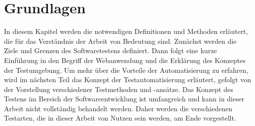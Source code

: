 \chapter{Grundlagen}\label{ch:grundlagen}

In diesem Kapitel werden die notwendigen Definitionen und Methoden erläutert,
die für das Verständnis der Arbeit von Bedeutung sind. Zunächst werden die
Ziele und Grenzen des Softwaretestens definiert. Dann folgt eine kurze
Einführung in den Begriff der Webanwendung und  die Erklärung des Konzeptes
der Testumgebung. Um mehr über die Vorteile der Automatisierung zu erfahren,
wird im nächsten Teil das Konzept der Testautomatisierung erläutert, gefolgt
von der Vorstellung verschiedener Testmethoden und -ansätze. Das Konzept des
Testens im Bereich der Softwareentwicklung ist umfangreich und kann in dieser
Arbeit nicht vollständig behandelt werden. Daher werden die verschiedenen
Testarten, die in dieser Arbeit von Nutzen sein werden, am Ende vorgestellt.











